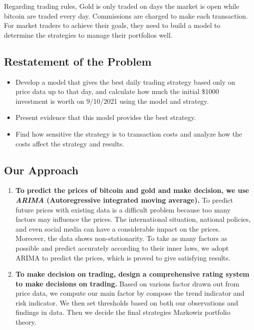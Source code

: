 \documentclass[12pt,a4paper]{article}
\newcommand{\Predictor}{ARIMA }
\begin{document}
\begin{spacing}{1.2}
 Regarding trading rules, Gold is only traded on days the market is open while bitcoin are traded every day. Commissions are charged to make each transaction. For market traders to achieve their goals, they need to build a model to determine the strategies to manage their portfolios well.

\subsection{Restatement of the Problem}

\begin{itemize}
	\item Develop a model that gives the best daily trading strategy based only on price data up 
	to that day, and calculate how much the initial \$1000 investment is worth on 9/10/2021 using the 
	model and strategy.
	
	\item Present evidence that this model provides the best strategy.
	
	\item Find how sensitive the strategy is to transaction costs and analyze how the costs
	affect the strategy and results.
	
\end{itemize}

\subsection{Our Approach}

\begin{enumerate}
	\item \textbf{To predict the prices of bitcoin and gold and make decision, we use \textit{\Predictor} (Autoregressive integrated moving average).}
	To predict future prices with existing data is a difficult problem because too many factors may influence the prices. The international situation, national policies, and even social media can have a considerable impact on the prices. Moreover, the data shows non-stationarity. To take as many factors as possible and predict accurately according to their inner laws, we adopt \Predictor to predict the prices, which is proved to give satisfying results.
	
	\item \textbf{To make decision on trading, design a comprehensive rating system to make decisions on trading.} Based on various factor drawn out from price data, we compute our main factor by compose the trend indicator and risk indicator. We then set thresholds based on both our observations and findings in data. Then we decide the final strategies Markowiz portfolio theory.
\end{enumerate}


\end{spacing}
\end{document}
